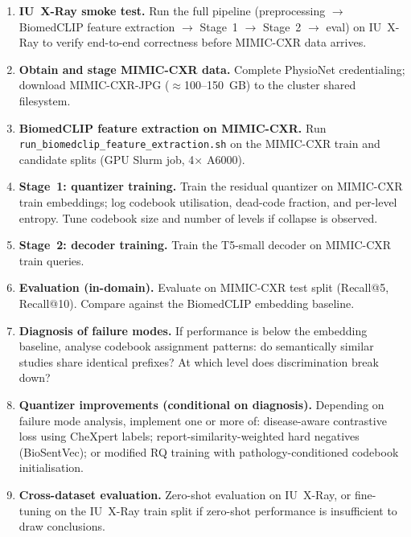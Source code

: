 \documentclass[11pt,a4paper]{article}
\begin{document}
\begin{enumerate}[itemsep=4pt]

    \item \textbf{IU~X-Ray smoke test.}
    Run the full pipeline (preprocessing $\to$ BiomedCLIP feature extraction
    $\to$ Stage~1 $\to$ Stage~2 $\to$ eval) on IU~X-Ray to verify end-to-end
    correctness before MIMIC-CXR data arrives.

    \item \textbf{Obtain and stage MIMIC-CXR data.}
    Complete PhysioNet credentialing; download MIMIC-CXR-JPG ($\approx$100--150~GB)
    to the cluster shared filesystem.

    \item \textbf{BiomedCLIP feature extraction on MIMIC-CXR.}
    Run \texttt{run\_biomedclip\_feature\_extraction.sh} on the MIMIC-CXR train
    and candidate splits (GPU Slurm job, 4$\times$ A6000).

    \item \textbf{Stage~1: quantizer training.}
    Train the residual quantizer on MIMIC-CXR train embeddings; log codebook
    utilisation, dead-code fraction, and per-level entropy.
    Tune codebook size and number of levels if collapse is observed.

    \item \textbf{Stage~2: decoder training.}
    Train the T5-small decoder on MIMIC-CXR train queries.

    \item \textbf{Evaluation (in-domain).}
    Evaluate on MIMIC-CXR test split (Recall@5, Recall@10).
    Compare against the BiomedCLIP embedding baseline.

    \item \textbf{Diagnosis of failure modes.}
    If performance is below the embedding baseline, analyse codebook assignment
    patterns: do semantically similar studies share identical prefixes?
    At which level does discrimination break down?

    \item \textbf{Quantizer improvements (conditional on diagnosis).}
    Depending on failure mode analysis, implement one or more of:
    disease-aware contrastive loss using CheXpert labels;
    report-similarity-weighted hard negatives (BioSentVec);
    or modified RQ training with pathology-conditioned codebook initialisation.

    \item \textbf{Cross-dataset evaluation.}
    Zero-shot evaluation on IU~X-Ray, or fine-tuning on the IU~X-Ray train
    split if zero-shot performance is insufficient to draw conclusions.

\end{enumerate}
\end{document}
